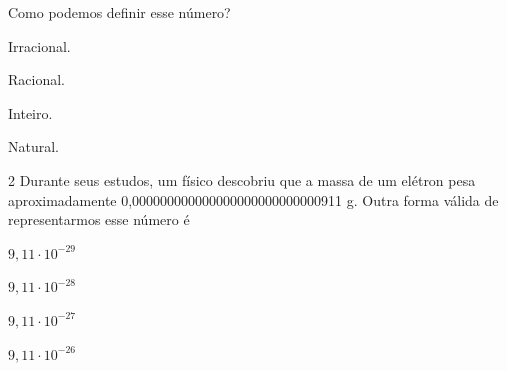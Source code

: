 Como podemos definir esse número?

\begin{escolha}
\item Irracional.
\item Racional.
\item Inteiro.
\item Natural.
\end{escolha}






\num{2} Durante seus estudos, um físico descobriu que a massa de um elétron
pesa aproximadamente 0,000000000000000000000000000911 g. Outra forma
válida de representarmos esse número é

\begin{escolha}
\item $9,11 \cdot 10^{-29}$
\item $9,11 \cdot 10^{-28}$
\item $9,11 \cdot 10^{-27}$
\item $9,11 \cdot 10^{-26}$
\end{escolha}







